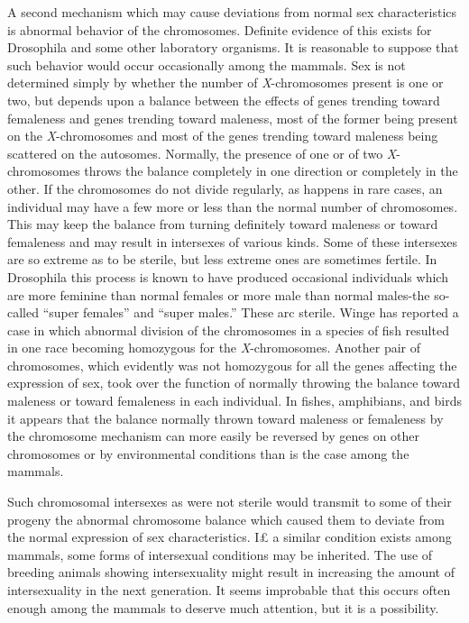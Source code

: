 A second mechanism which may cause deviations from normal sex
characteristics is abnormal behavior of the chromosomes. Definite evidence
of this exists for Drosophila and some other laboratory organisms.
It is reasonable to suppose that such behavior would occur occasionally
among the mammals. Sex is not determined simply by whether
the number of \textit{X}-chromosomes present is one or two, but depends
upon a balance between the effects of genes trending toward femaleness
and genes trending toward maleness, most of the former being present on
the \textit{X}-chromosomes and most of the genes trending toward maleness
being scattered on the autosomes. Normally, the presence of one or of
two \textit{X}-chromosomes throws the balance completely in one direction or
completely in the other. If the chromosomes do not divide regularly, as
happens in rare cases, an individual may have a few more or less than
the normal number of chromosomes. This may keep the balance from
turning definitely toward maleness or toward femaleness and may result
in intersexes of various kinds. Some of these intersexes are so extreme as
to be sterile, but less extreme ones are sometimes fertile. In Drosophila
this process is known to have produced occasional individuals which
are more feminine than normal females or more male than normal
males-the so-called ``super females'' and ``super males.'' These arc
sterile. Winge has reported a case in which abnormal division of the
chromosomes in a species of fish resulted in one race becoming homozygous
for the \textit{X}-chromosomes. Another pair of chromosomes, which evidently
was not homozygous for all the genes affecting the expression of
sex, took over the function of normally throwing the balance toward
maleness or toward femaleness in each individual. In fishes, amphibians,
and birds it appears that the balance normally thrown toward
maleness or femaleness by the chromosome mechanism can more easily
be reversed by genes on other chromosomes or by environmental conditions
than is the case among the mammals.

Such chromosomal intersexes as were not sterile would transmit to
some of their progeny the abnormal chromosome balance which caused
them to deviate from the normal expression of sex characteristics. I£ a
similar condition exists among mammals, some forms of intersexual
conditions may be inherited. The use of breeding animals showing
intersexuality might result in increasing the amount of intersexuality in
the next generation. It seems improbable that this occurs often enough
among the mammals to deserve much attention, but it is a possibility.

